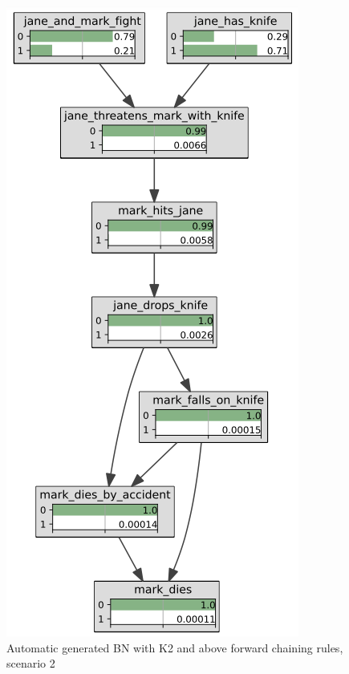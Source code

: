\begin{figure}[htbp]
\begin{center}
\includegraphics[scale = 0.5]{images/Kb2.png}
\caption{Automatic generated BN with K2 and above forward chaining rules, scenario 2}
\label{kb2}
\end{center}
\end{figure}

